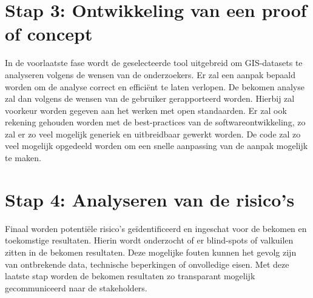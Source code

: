 \section{Stap 3: Ontwikkeling van een proof of concept}
In de voorlaatste fase wordt de geselecteerde tool uitgebreid om GIS-datasets te analyseren volgens de wensen van de onderzoekers. Er zal een aanpak bepaald worden om de analyse correct en efficiënt te laten verlopen. De bekomen analyse zal dan volgens de wensen van de gebruiker gerapporteerd worden. Hierbij zal voorkeur worden gegeven aan het werken met open standaarden. Er zal ook rekening gehouden worden met de best-practices van de softwareontwikkeling, zo zal er zo veel mogelijk generiek en uitbreidbaar gewerkt worden. De code zal zo veel mogelijk opgedeeld worden om een snelle aanpassing van de aanpak mogelijk te maken.

\section{Stap 4: Analyseren van de risico's}
Finaal worden potentiële risico's geïdentificeerd en ingeschat voor de bekomen en toekomstige resultaten. Hierin wordt onderzocht of er blind-spots of valkuilen zitten in de bekomen resultaten. Deze mogelijke fouten kunnen het gevolg zijn van ontbrekende data, technische beperkingen of onvolledige eisen. Met deze laatste stap worden de bekomen resultaten zo transparant mogelijk gecommuniceerd naar de stakeholders.



